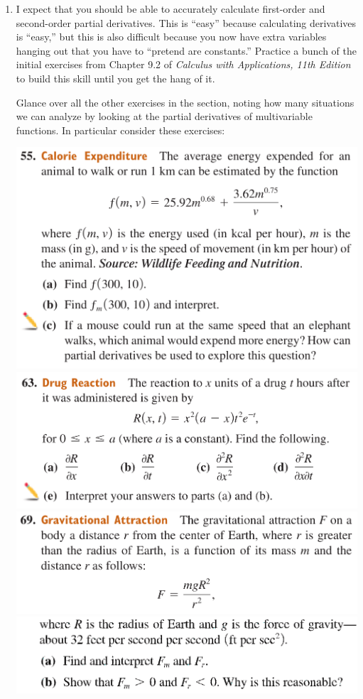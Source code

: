 \begin{enumerate}
    \item 
        I expect that you should be able to accurately 
        calculate first-order and second-order partial derivatives.
        This is ``easy'' because calculating derivatives is ``easy,''
        but this is also difficult because you now have extra variables 
        hanging out that you have to ``pretend are constants.''
        Practice a bunch of the initial exercises 
        from Chapter 9.2 of \emph{Calculus with Applications, 11th Edition}
        to build this skill until you get the hang of it.
        
        Glance over all the other exercises in the section, 
        noting how many situations we can analyze by looking at 
        the partial derivatives of multivariable functions.
        In particular consider these exercises:
        \begin{center}
            \includegraphics[width=.83\textwidth]{screenshots/55.png}
            \includegraphics[width=.83\textwidth]{screenshots/63.png}
            \includegraphics[width=.83\textwidth]{screenshots/69-1.png}
            \includegraphics[width=.83\textwidth]{screenshots/69-2.png}
        \end{center}


\end{enumerate}
